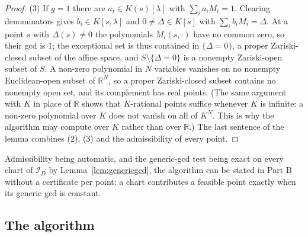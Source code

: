 \documentclass[journal]{IEEEtran}
\theoremstyle{plainn}
\theoremstyle{remark}
\begin{document}
\begin{proof}
(3) If $g=1$ there are $a_i\in K(s)[\lambda]$ with $\sum_i a_iM_i=1$. Clearing denominators gives
$b_i\in K[s,\lambda]$ and $0\neq\Delta\in K[s]$ with $\sum_i b_iM_i=\Delta$. At a point $s$ with
$\Delta(s)\neq0$ the polynomials $M_i(s,\cdot)$ have no common zero, so their gcd is $1$; the exceptional
set is thus contained in $\{\Delta=0\}$, a proper Zariski-closed subset of the affine space, and
$S\setminus\{\Delta=0\}$ is a nonempty Zariski-open subset of $S$. A non-zero polynomial in $N$ variables
vanishes on no nonempty Euclidean-open subset of $\mathbb R^N$, so a proper Zariski-closed subset contains
no nonempty open set, and its complement has real points. (The same argument with $K$ in place of
$\mathbb R$ shows that $K$-rational points suffice whenever $K$ is infinite: a non-zero polynomial over $K$
does not vanish on all of $K^N$. This is why the algorithm may compute over $K$ rather than over
$\mathbb R$.) The last sentence of the lemma combines (2), (3) and the admissibility of every point.
\end{proof}

Admissibility being automatic, and the generic-gcd test being exact on every chart of $\mathcal I_D$ by
Lemma~\ref{lem:genericgcd}, the algorithm can be stated in Part B without a certificate per point: a chart
contributes a feasible point exactly when its generic gcd is constant.

\subsection{The algorithm}\label{sec:algorithm}
\end{document}
